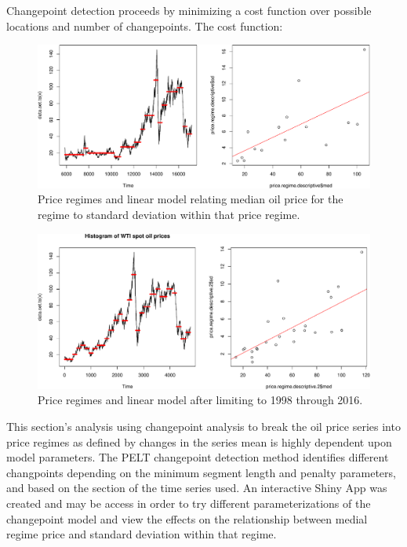 \documentclass[11pt,]{article}
\begin{document}
Changepoint detection proceeds by minimizing a cost function over
possible locations and number of changepoints. The cost function:

\begin{figure}[htbp]
\centering
\includegraphics{Figs/unnamed-chunk-13-1.pdf}
\caption{Price regimes and linear model relating median oil price for
the regime to standard deviation within that price regime.}
\end{figure}

\begin{figure}[htbp]
\centering
\includegraphics{Figs/unnamed-chunk-15-1.pdf}
\caption{Price regimes and linear model after limiting to 1998 through
2016.}
\end{figure}

This section's analysis using changepoint analysis to break the oil
price series into price regimes as defined by changes in the series mean
is highly dependent upon model parameters. The PELT changepoint
detection method identifies different changpoints depending on the
minimum segment length and penalty parameters, and based on the section
of the time series used. An interactive Shiny App was created and may be
access in order to try different parameterizations of the changepoint
model and view the effects on the relationship between medial regime
price and standard deviation within that regime.
\end{document}
